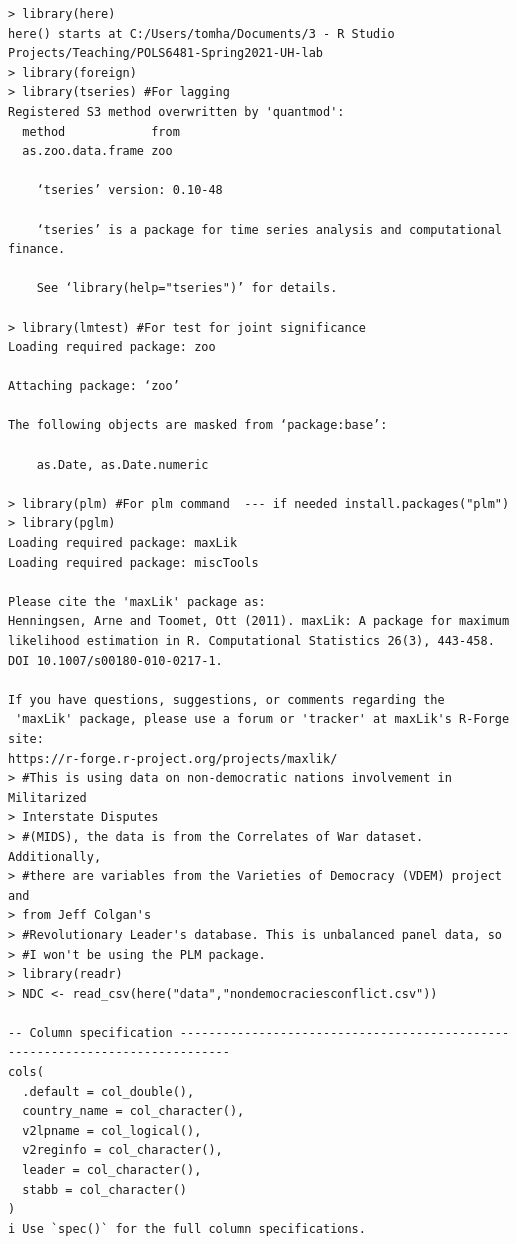 \documentclass[12pt]{article}
\begin{document}
\begin{verbatim}
> library(here)
here() starts at C:/Users/tomha/Documents/3 - R Studio Projects/Teaching/POLS6481-Spring2021-UH-lab
> library(foreign)
> library(tseries) #For lagging
Registered S3 method overwritten by 'quantmod':
  method            from
  as.zoo.data.frame zoo 

    ‘tseries’ version: 0.10-48

    ‘tseries’ is a package for time series analysis and computational finance.

    See ‘library(help="tseries")’ for details.

> library(lmtest) #For test for joint significance
Loading required package: zoo

Attaching package: ‘zoo’

The following objects are masked from ‘package:base’:

    as.Date, as.Date.numeric

> library(plm) #For plm command  --- if needed install.packages("plm")
> library(pglm)
Loading required package: maxLik
Loading required package: miscTools

Please cite the 'maxLik' package as:
Henningsen, Arne and Toomet, Ott (2011). maxLik: A package for maximum 
likelihood estimation in R. Computational Statistics 26(3), 443-458. 
DOI 10.1007/s00180-010-0217-1.

If you have questions, suggestions, or comments regarding the
 'maxLik' package, please use a forum or 'tracker' at maxLik's R-Forge site:
https://r-forge.r-project.org/projects/maxlik/
> #This is using data on non-democratic nations involvement in Militarized
> Interstate Disputes
> #(MIDS), the data is from the Correlates of War dataset. Additionally, 
> #there are variables from the Varieties of Democracy (VDEM) project and 
> from Jeff Colgan's
> #Revolutionary Leader's database. This is unbalanced panel data, so
> #I won't be using the PLM package. 
> library(readr)
> NDC <- read_csv(here("data","nondemocraciesconflict.csv"))

-- Column specification -----------------------------------------------------------------------------
cols(
  .default = col_double(),
  country_name = col_character(),
  v2lpname = col_logical(),
  v2reginfo = col_character(),
  leader = col_character(),
  stabb = col_character()
)
i Use `spec()` for the full column specifications.


\end{verbatim}
\end{document}
